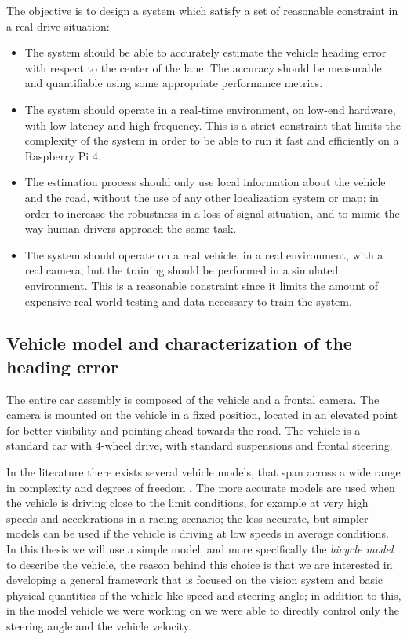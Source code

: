 \documentclass[a4paper,12pt,sort&compress]{article}
\begin{document}
    The objective is to design a system which satisfy a set of reasonable
    constraint in a real drive situation:
    \begin{itemize}
        \item The system should be able to accurately estimate the vehicle heading error with
        respect to the center of the lane. The accuracy should be measurable and
            quantifiable using some appropriate performance metrics.
        \item The system should operate in a real-time environment, on low-end hardware, with low
            latency and high frequency. This is a strict constraint that limits the complexity of
            the system in order to be able to run it fast and efficiently on a Raspberry Pi 4.
        \item The estimation process should only use local information about the
            vehicle and the road, without the use of any other localization system
            or map; in order to increase the robustness in a loss-of-signal
            situation, and to mimic the way human drivers approach the same
            task.
        \item The system should operate on a real vehicle, in a real environment, with a real
            camera; but the training should be performed in a simulated environment. This is a
            reasonable constraint since it limits the amount of expensive real world testing and
            data necessary to train the system.
    \end{itemize}

\subsection{Vehicle model and characterization of the heading error}
    The entire car assembly is composed of the vehicle and a frontal camera. The
    camera is mounted on the vehicle in a fixed position, located in an elevated
    point for better visibility and pointing ahead towards the road. The vehicle
    is a standard car with 4-wheel drive, with standard suspensions and frontal
    steering.

    In the literature there exists several vehicle models, that span across a
    wide range in complexity and degrees of freedom \citep{doi:10.1080/00423119508969086}. The more accurate
    models are used when the vehicle is driving close to the limit conditions,
    for example at very high speeds and accelerations in a racing scenario; the
    less accurate, but simpler models can be used if the vehicle is driving at
    low speeds in average conditions. In this thesis we will use a simple model,
    and more specifically the \textit{bicycle model} \citep{7995816} to describe the vehicle,
    the reason behind this choice is that we are interested in developing a
    general framework that is focused on the vision system and basic physical
    quantities of the vehicle like speed and steering angle; in addition to
    this, in the model vehicle we were working on we were able to directly
    control only the steering angle and the vehicle velocity. 
\end{document}
